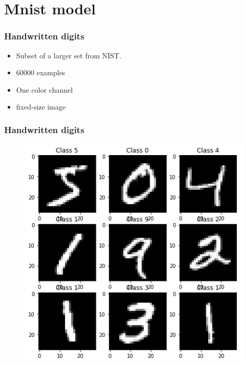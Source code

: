 \section{Mnist model}


\begin{frame}  
    \frametitle{Handwritten digits}
	\begin{itemize}
		\item Subset of a larger set from NIST.
		\item 60000 examples
		\item One color channel
    	\item fixed-size image
	\end{itemize}
\end{frame}

\begin{frame}  
    \frametitle{Handwritten digits}
    \begin{figure}
		\includegraphics[scale=0.3]{figure/handwritten.png}
	\end{figure}

\end{frame}




